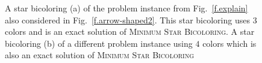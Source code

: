 \documentclass[12pt, twoside,a4paper,toc=bibliography]{scrbook}
\newcommand{\MinStaBic}{\textsc{Minimum Star Bicoloring}}
\begin{document}
\begin{figure}
\centering
{}%
\hfill
{}%
\caption{A star bicoloring (a) of the problem instance from
Fig.~\protect\ref{f.explain} also considered in Fig.~\protect\ref{f.arrow-shaped2}. This
star bicoloring uses $3$ colors and is an exact solution of \MinStaBic. A star bicoloring
(b) of a different problem instance using $4$ colors which is also an exact
solution of \MinStaBic} \label{f.arrow-shaped4}
\end{figure}
\end{document}
